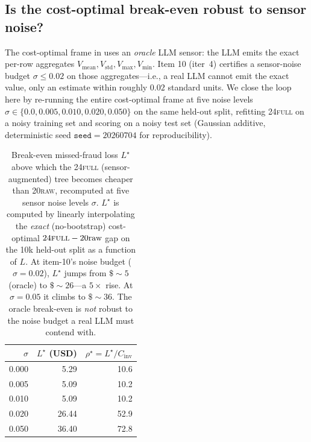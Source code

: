 \subsection{Is the cost-optimal break-even robust to sensor noise?}
\label{sec:p8-evidence-noisy-sensor}

The cost-optimal frame in  uses an
\emph{oracle} LLM sensor: the LLM emits the exact per-row aggregates
$V_\text{mean}, V_\text{std}, V_\text{max}, V_\text{min}$. Item 10
(iter~4) certifies a sensor-noise budget $\sigma \le 0.02$ on those
aggregates---i.e., a real LLM cannot emit the exact value, only an
estimate within roughly $0.02$ standard units. We close the loop here by
re-running the entire cost-optimal frame at five noise levels
$\sigma \in \{0.0, 0.005, 0.010, 0.020, 0.050\}$ on the same held-out
split, refitting \textsc{24full} on a noisy training set and scoring on
a noisy test set (Gaussian additive, deterministic seed
$\texttt{seed}=20260704$ for reproducibility).

\begin{table}[t]
\centering
\small
\caption{Break-even missed-fraud loss $L^\star$ above which the
\textsc{24full} (sensor-augmented) tree becomes cheaper than
\textsc{20raw}, recomputed at five sensor noise levels
$\sigma$. $L^\star$ is computed by linearly interpolating the
\emph{exact} (no-bootstrap) cost-optimal $24\textsc{full}-20\text{raw}$
gap on the 10k held-out split as a function of $L$. At item-10's noise
budget ($\sigma{=}0.02$), $L^\star$ jumps from
$\$\sim5$ (oracle) to $\$\sim 26$---a $5\times$ rise. At
$\sigma{=}0.05$ it climbs to $\$\sim 36$. The oracle break-even is
\emph{not} robust to the noise budget a real LLM must contend with.}
\label{tab:p8-noisy-be}
\begin{tabular}{r r r}
\toprule
$\sigma$ & $L^\star$ (USD) & $\rho^\star = L^\star / C_\text{inv}$ \\
\midrule
0.000 &  5.29 & 10.6 \\
0.005 &  5.09 & 10.2 \\
0.010 &  5.09 & 10.2 \\
0.020 & 26.44 & 52.9 \\
0.050 & 36.40 & 72.8 \\
\bottomrule
\end{tabular}
\end{table}

